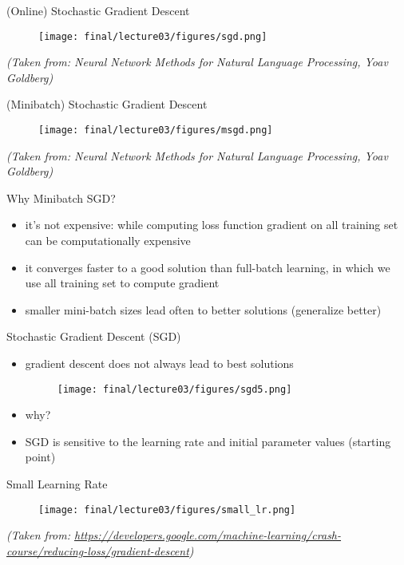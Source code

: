 \begin{frame}{(Online) Stochastic Gradient Descent}
\centering
\begin{figure}
    \texttt{[image: final/lecture03/figures/sgd.png]}
\end{figure}
\vspace*{\fill}
\textit{\tiny{(Taken from: Neural Network Methods for Natural Language Processing, Yoav Goldberg)}}
\end{frame}
\begin{frame}{\Large{(Minibatch) Stochastic Gradient Descent}}
\centering
\begin{figure}
    \texttt{[image: final/lecture03/figures/msgd.png]}
\end{figure}
\vspace*{\fill}
\textit{\tiny{(Taken from: Neural Network Methods for Natural Language Processing, Yoav Goldberg)}}
\end{frame}
\begin{frame}{Why Minibatch SGD?}
    \begin{itemize}
        \item<1-> it's not expensive: while computing loss function gradient on all training set can be computationally
expensive 
        \item<2-> it converges faster to a good solution than full-batch learning, in which we use all training set to compute gradient
        \item<3-> smaller mini-batch sizes lead often to better solutions (generalize better)
    \end{itemize}
\end{frame}
\begin{frame}{Stochastic Gradient Descent (SGD)}
    \begin{itemize}
        \item<1-> gradient descent does not always lead to best solutions
        \begin{figure}
            \texttt{[image: final/lecture03/figures/sgd5.png]}
        \end{figure}
        \item<2-> why? 
        \item<3-> SGD is sensitive to the learning rate and initial parameter values (starting point)
    \end{itemize}
\end{frame}
\begin{frame}{Small Learning Rate}
         \begin{figure}
        \centering
         \texttt{[image: final/lecture03/figures/small\_lr.png]}
        \end{figure}
\vspace*{\fill}
\textit{\tiny{(Taken from: 
\url{https://developers.google.com/machine-learning/crash-course/reducing-loss/gradient-descent})}}     
\end{frame}
